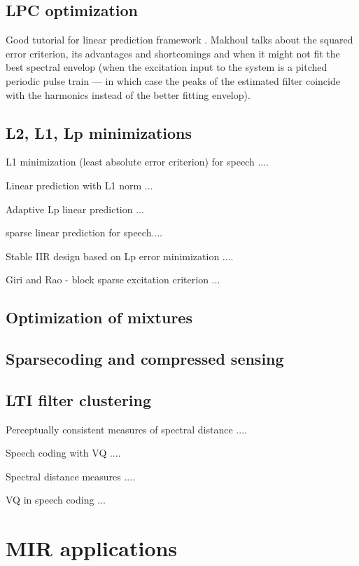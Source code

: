 \documentclass[journal]{IEEEtran}
\begin{document}
\subsection{LPC optimization}
Good tutorial for linear prediction framework \cite{makhoul1975linearPredictionTutorial}. Makhoul talks about the squared error criterion, its advantages and shortcomings and when it might not fit the best spectral envelop (when the excitation input to the system is a pitched periodic pulse train --- in which case the peaks of the estimated filter coincide with the harmonics instead of the better fitting envelop).
\subsection{L2, L1, Lp minimizations}
L1 minimization (least absolute error criterion) for speech \cite{denoel1985leastAbsolute}....

Linear prediction with L1 norm \cite{schroeder1989linear}...

Adaptive Lp linear prediction \cite{lansford1988adaptive}...

\cite{giacobello2008sparse,giacobello2012sparse} sparse linear prediction for speech....

Stable IIR design based on Lp error minimization \cite{tseng2004design}....

Giri and Rao - block sparse excitation criterion \cite{giri2014block}...
\subsection{Optimization of mixtures}
\subsection{Sparsecoding and compressed sensing}
\subsection{LTI filter clustering}
Perceptually consistent measures of spectral distance \cite{viswanathan1976spectralDistance}....

Speech coding with VQ \cite{makhoul1985VQ}....

Spectral distance measures \cite{viswanathan1976spectralDistance}....

VQ in speech coding \cite{gersho1992vq}...

\section{MIR applications}
\end{document}
